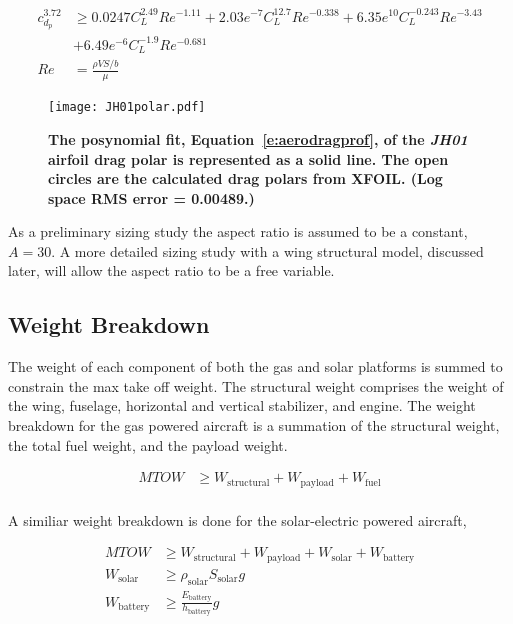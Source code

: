 \documentclass[]{aiaa-tc}%
\begin{document}
    \begin{align}
        \label{e:aerodragprof}
        c_{d_p}^{3.72} &\geq 0.0247C_L^{2.49}Re^{-1.11} + 2.03e^{-7}C_L^{12.7}Re^{-0.338} + 6.35e^{10}C_L^{-0.243}Re^{-3.43} \nonumber \\
                       &+ 6.49e^{-6}C_L^{-1.9}Re^{-0.681} \\
        Re &= \frac{\rho V S/b}{\mu}
    \end{align}

\begin{figure}[H]
	\begin{center}
	\texttt{[image: JH01polar.pdf]}
    \caption{ \textbf{ The posynomial fit, Equation~\eqref{e:aerodragprof}, of the \emph{JH01} airfoil drag polar is represented as a solid line.  The open circles are the calculated drag polars from XFOIL. (Log space RMS error = 0.00489.)} }
	\label{f:JH01polar}
	\end{center}
\end{figure}

As a preliminary sizing study the aspect ratio is assumed to be a constant, $A = 30$.  A more detailed sizing study with a wing structural model, discussed later, will allow the aspect ratio to be a free variable. 

\subsection{Weight Breakdown}

The weight of each component of both the gas and solar platforms is summed to constrain the max take off weight.  
The structural weight comprises the weight of the wing, fuselage, horizontal and vertical stabilizer, and engine. 
The weight breakdown for the gas powered aircraft is a summation of the structural weight, the total fuel weight, and the payload weight. 

\begin{align}
    \label{e:weightmtow}
    MTOW &\geq W_{\text{structural}}  + W_{\text{payload}} + W_{\text{fuel}} \\
\end{align}

A similiar weight breakdown is done for the solar-electric powered aircraft, 

\begin{align}
    \label{e:weightsmtow}
    MTOW &\geq W_{\text{structural}} + W_{\text{payload}} + W_{\text{solar}} + W_{\text{battery}} \\
    W_{\text{solar}} &\geq \rho_{\text{solar}} S_{\text{solar}} g \\
    W_{\text{battery}} &\geq \frac{E_{\text{battery}}}{h_{\text{battery}}} g
\end{align}
\end{document}
